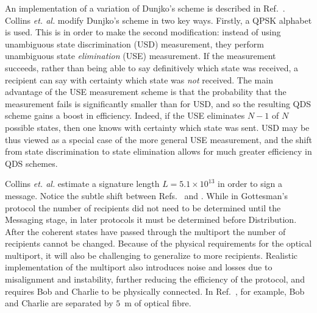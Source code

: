An implementation of a variation of Dunjko's scheme is described in Ref.~\cite{Collins2014}. Collins \emph{et. al.} modify Dunjko's scheme in two key ways. Firstly, a QPSK alphabet is used. This is in order to make the second modification: instead of using unambiguous state discrimination (USD) measurement, they perform unambiguous state \emph{elimination} (USE) measurement. If the measurement succeeds, rather than being able to say definitively which state was received, a recipient can say with certainty which state was \emph{not} received. %
The main advantage of the USE measurement scheme is that the probability that the measurement fails is significantly smaller than for USD, and so the resulting QDS scheme gains a boost in efficiency. Indeed, if the USE eliminates $N-1$ of $N$ possible states, then one knows with certainty which state was sent. USD may be thus viewed as a special case of the more general USE measurement, and the shift from state discrimination to state elimination allows for much greater efficiency in QDS schemes. %


Collins \emph{et. al.} estimate a signature length $L = 5.1 \times 10^{13}$ in order to sign a message. Notice the subtle shift between Refs.~\cite{Gottesman2001} and \cite{Andersson2006, Clarke2012, Dunjko2014, Collins2014}. While in Gottesman's protocol the number of recipients did not need to be determined until the Messaging stage, in later protocols it must be determined before Distribution. After the coherent states have passed through the multiport the number of recipients cannot be changed. 
Because of the physical requirements for the optical multiport, it will also be challenging to generalize to more recipients. %
Realistic implementation of the multiport also introduces noise and losses due to misalignment and instability, further reducing the efficiency of the protocol, and requires Bob and Charlie to be physically connected. In Ref.~\cite{Clarke2012, Collins2014}, for example, Bob and Charlie are separated by $5$~m of optical fibre. 



